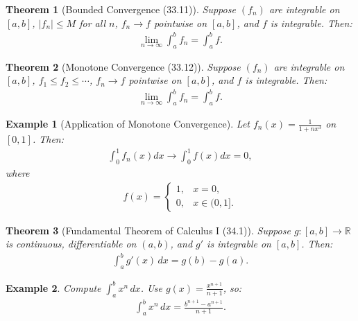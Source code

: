 \documentclass[7pt]{article}
\theoremstyle{definition}
\theoremstyle{plain}
\newtheorem{theorem}{Theorem}
\newtheorem{example}{Example}
\begin{document}
\begin{theorem}[Bounded Convergence (33.11)]
Suppose $ (f_n) $ are integrable on $ [a, b] $, $ |f_n| \leq M $ for all $ n $, $ f_n \to f $ pointwise on $ [a, b] $, and $ f $ is integrable. Then:
\begin{align}
\lim_{n \to \infty} \int_a^b f_n = \int_a^b f.
\end{align}
\end{theorem}

\begin{theorem}[Monotone Convergence (33.12)]
Suppose $ (f_n) $ are integrable on $ [a, b] $, $ f_1 \leq f_2 \leq \cdots $, $ f_n \to f $ pointwise on $ [a, b] $, and $ f $ is integrable. Then:
\begin{align}
\lim_{n \to \infty} \int_a^b f_n = \int_a^b f.
\end{align}
\end{theorem}

\begin{example}[Application of Monotone Convergence]
Let $ f_n(x) = \frac{1}{1 + nx^3} $ on $ [0, 1] $. Then:
\begin{align}
\int_0^1 f_n(x) dx \to \int_0^1 f(x) dx = 0,
\end{align}
where 
\begin{align}
     f(x) = \begin{cases} 1, & x = 0, \\ 0, & x \in (0, 1]. \end{cases} 
\end{align}
\end{example}

\begin{theorem}[Fundamental Theorem of Calculus I (34.1)]
Suppose $ g : [a, b] \to \mathbb{R} $ is continuous, differentiable on $ (a, b) $, and $ g' $ is integrable on $ [a, b] $. Then:
\begin{align}
\int_a^b g'(x) \, dx = g(b) - g(a).
\end{align}
\end{theorem}

\begin{example}
Compute $ \int_a^b x^n \, dx $. Use $ g(x) = \frac{x^{n+1}}{n+1} $, so:
\begin{align}
\int_a^b x^n \, dx = \frac{b^{n+1} - a^{n+1}}{n+1}.
\end{align}
\end{example}
\end{document}
